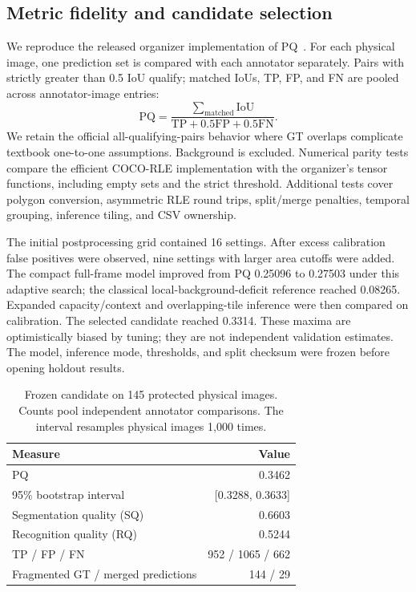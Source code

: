 \documentclass[sigconf]{acmart}
\begin{document}
\subsection{Metric fidelity and candidate selection}
We reproduce the released organizer implementation of PQ~\cite{panoptic}. For each physical image, one prediction set is compared with each annotator separately. Pairs with strictly greater than 0.5 IoU qualify; matched IoUs, TP, FP, and FN are pooled across annotator-image entries:
\[
\mathrm{PQ}=\frac{\sum_{\mathrm{matched}}\mathrm{IoU}}{\mathrm{TP}+0.5\mathrm{FP}+0.5\mathrm{FN}}.
\]
We retain the official all-qualifying-pairs behavior where GT overlaps complicate textbook one-to-one assumptions. Background is excluded. Numerical parity tests compare the efficient COCO-RLE implementation with the organizer's tensor functions, including empty sets and the strict threshold. Additional tests cover polygon conversion, asymmetric RLE round trips, split/merge penalties, temporal grouping, inference tiling, and CSV ownership.

The initial postprocessing grid contained 16 settings. After excess calibration false positives were observed, nine settings with larger area cutoffs were added. The compact full-frame model improved from PQ 0.25096 to 0.27503 under this adaptive search; the classical local-background-deficit reference reached 0.08265. Expanded capacity/context and overlapping-tile inference were then compared on calibration. The selected candidate reached 0.3314. These maxima are optimistically biased by tuning; they are not independent validation estimates. The model, inference mode, thresholds, and split checksum were frozen before opening holdout results.

\begin{table}[t]
\centering
\caption{Frozen candidate on 145 protected physical images. Counts pool independent annotator comparisons. The interval resamples physical images 1,000 times.}
\begin{tabular}{lr}
\toprule
Measure & Value \\
\midrule
PQ & 0.3462 \\
95\% bootstrap interval & [0.3288, 0.3633] \\
Segmentation quality (SQ) & 0.6603 \\
Recognition quality (RQ) & 0.5244 \\
TP / FP / FN & 952 / 1065 / 662 \\
Fragmented GT / merged predictions & 144 / 29 \\
\bottomrule
\end{tabular}
\end{table}
\end{document}
